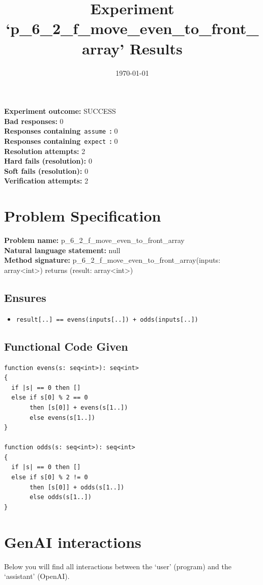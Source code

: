 \documentclass{article}
\begin{document}
\title{Experiment `p\_6\_2\_f\_move\_even\_to\_front\_array' Results}
\author{\today}
\date{}
\maketitle
\textbf{Experiment outcome: }SUCCESS
\\\textbf{Bad responses: }0
\\\textbf{Responses containing}~\texttt{assume}~\textbf{: }0
\\\textbf{Responses containing}~\texttt{expect}~\textbf{: }0
\\\textbf{Resolution attempts: }2
\\\textbf{Hard fails (resolution): }0
\\\textbf{Soft fails (resolution): }0
\\\textbf{Verification attempts: }2
\section*{Problem Specification}
\textbf{Problem name: }p\_6\_2\_f\_move\_even\_to\_front\_array
\\\textbf{Natural language statement: }null
\\\textbf{Method signature: }p\_6\_2\_f\_move\_even\_to\_front\_array(inputs: array<int>) returns (result: array<int>)
\subsection*{Ensures}
\begin{itemize}
\item \texttt{result[..] == evens(inputs[..]) + odds(inputs[..])}
\end{itemize}
\subsection*{Functional Code Given}
\begin{lstlisting}
function evens(s: seq<int>): seq<int>
{
  if |s| == 0 then []
  else if s[0] % 2 == 0
       then [s[0]] + evens(s[1..])
       else evens(s[1..])
}

function odds(s: seq<int>): seq<int>
{
  if |s| == 0 then []
  else if s[0] % 2 != 0
       then [s[0]] + odds(s[1..])
       else odds(s[1..])
}
\end{lstlisting}
\clearpage
\section*{GenAI interactions}
Below you will find all interactions between the `user' (program) and the `assistant' (OpenAI).
\end{document}
